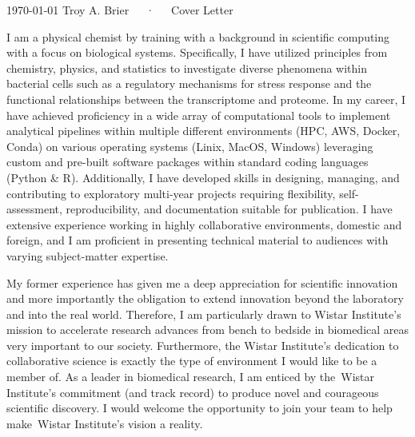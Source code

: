 \documentclass[11pt, a4paper]{awesome-cv}
\newcommand{\companyname}{Wistar Institute}
\begin{document}
	
	\makecvheader[R]
	
	\makecvfooter
	{\today}
	{Troy A. Brier~~~·~~~Cover Letter}
	{}
	
	\makelettertitle
	
	\begin{cvletter}
		
		I am a physical chemist by training with a background in scientific computing with a focus on biological systems.
		Specifically, I have utilized principles from chemistry, physics, and statistics to investigate diverse phenomena within bacterial cells such as a regulatory mechanisms for stress response and the functional relationships between the transcriptome and proteome.	
		In my career, I have achieved proficiency in a wide array of computational tools to implement analytical pipelines within multiple different environments (HPC, AWS, Docker, Conda) on various operating systems (Linix, MacOS, Windows) leveraging custom and pre-built software packages within standard coding languages (Python \& R).
		Additionally, I have developed skills in designing, managing, and contributing to exploratory multi-year projects requiring flexibility, self-assessment, reproducibility, and documentation suitable for publication.
		I have extensive experience working in highly collaborative environments, domestic and foreign, and I am proficient in presenting technical material to audiences with varying subject-matter expertise.
				
		\lettersection{Why the \companyname?}
		My former experience has given me a deep appreciation for scientific innovation and more importantly the obligation to extend  innovation beyond the laboratory and into the real world. 	
		Therefore, I am particularly drawn to \companyname's mission to accelerate research advances from bench to bedside in biomedical areas very important to our society.
		Furthermore, the \companyname's dedication to collaborative science is exactly the type of environment I would like to be a member of.
		As a leader in biomedical research, I am enticed by the~\companyname's commitment (and track record) to produce novel and courageous scientific discovery.  
		I would welcome the opportunity to join your team to help make~\companyname's vision a reality.
		

\end{cvletter}
\end{document}
